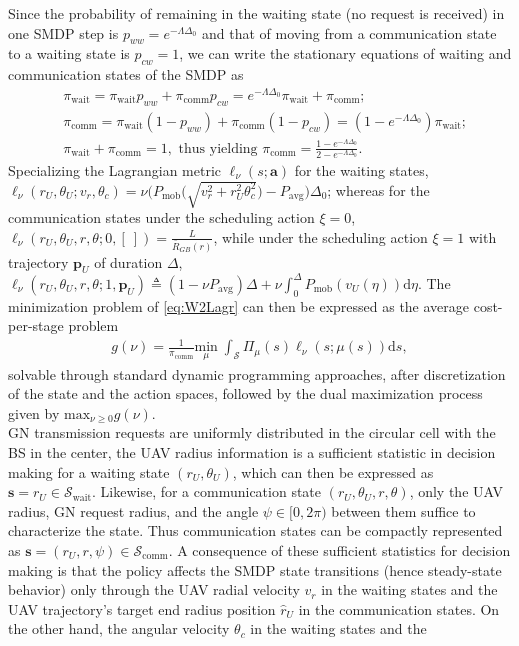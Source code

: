 \documentclass[10pt, twocolumn]{IEEEtran}
\theoremstyle{plain}
\theoremstyle{definition}
\theoremstyle{remark}
\begin{document}
Since the probability of remaining in the waiting state (no request is received) in one SMDP step is $p_{ww}{=}e^{-\Lambda \Delta_0}$ and that of moving from a communication state to a waiting state is
$p_{cw}{=}1$, we can write the stationary equations of waiting and communication states of the SMDP as
\begin{align}
    &\pi_{\mathrm{wait}}{=}\pi_{\mathrm{wait}}p_{ww}{+}\pi_{\mathrm{comm}}p_{cw}{=}e^{{-}\Lambda\Delta_{0}}\pi_{\mathrm{wait}}{+}\pi_{\mathrm{comm}};\nonumber\\
    &\pi_{\mathrm{comm}}{=}\pi_{\mathrm{wait}}(1{-}p_{ww}){+}\pi_{\mathrm{comm}}(1{-}p_{cw}){=}(1{-}e^{{-}\Lambda\Delta_{0}})\pi_{\mathrm{wait}};\nonumber\\
    &\pi_{\mathrm{wait}}{+}\pi_{\mathrm{comm}}{=}1,\text{ thus yielding }\pi_{\mathrm{comm}}{=}\frac{1{-}e^{{-}\Lambda\Delta_{0}}}{2{-}e^{{-}\Lambda\Delta_{0}}}.
\end{align}
Specializing the Lagrangian metric $\ell_{\nu}(s;\mathbf{a})$ for the waiting states, $\ell_{\nu}(r_{U},\theta_{U};v_{r},\theta_{c}){=}\nu\Big(P_{\mathrm{mob}}\Big(\sqrt{v_{r}^{2}{+}r_{U}^{2}\theta_{c}^{2}}\Big){-}P_{\mathrm{avg}}\Big)\Delta_{0}$; whereas for the {communication} states under the scheduling action $\xi{=}0$, $\ell_{\nu}(r_{U},\theta_{U},r,\theta;0, [\ ]){=}\frac{L}{\bar{R}_{GB}(r)}$, while under the scheduling action $\xi{=}1$ with trajectory $\mathbf{p}_{U}$ of duration $\Delta$, $\ell_{\nu}(r_{U},\theta_{U},r,\theta;1,\mathbf{p}_{U}){\triangleq}(1{-}\nu P_{\mathrm{avg}})\Delta{+}\nu\int_{0}^\Delta P_{\mathrm{mob}}\left(v_{U}(\eta)\right)\mathrm{d}\eta$. The minimization problem of \eqref{eq:W2Lagr} can then be expressed as the {average cost-per-stage problem}
\begin{align}\label{eq:TotalGMin}
	g(\nu) = \frac{1}{\pi_{\mathrm{comm}}}\underset{\mu}{\mathrm{min}} \; \int_{\mathcal{S}} \Pi_{\mu}(s) 
	\ell_\nu(s; \mu(s))\mathrm d s,
\end{align}
solvable through standard dynamic programming approaches, after discretization of the state and the action spaces, followed by the dual maximization process given by $\mathrm{max}_{\nu{\geq}0}g(\nu)$.\\
 GN transmission requests are uniformly distributed in the circular cell with the BS in the center, the UAV radius information is a sufficient statistic in decision making for a {waiting} state $(r_{U},\theta_{U})$, which can then be expressed as $\mathbf{s}{=}r_{U}{\in}\mathcal{S}_{\mathrm{wait}}$. Likewise, for a {communication} state $(r_{U},\theta_{U},r,\theta)$, only the UAV radius, GN request radius, and the angle $\psi{\in}[0,2\pi)$ between them suffice to characterize the state. Thus {communication} states can be compactly represented as $\mathbf{s}{=}(r_{U},r,\psi){\in}\mathcal{S}_{\mathrm{comm}}$. A consequence of these sufficient statistics for decision making is that the policy affects the SMDP state transitions (hence steady-state behavior) only through the UAV radial velocity $v_{r}$ in the {waiting} states and the UAV trajectory's target end radius position $\hat{r}_{U}$ in the {communication} states. On the other hand, the angular velocity $\theta_{c}$ in the {waiting} states and the
\end{document}
